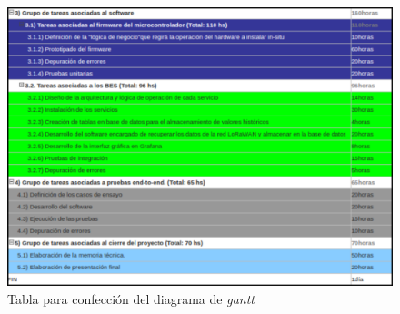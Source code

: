 \documentclass[11pt]{charter}
\begin{document}
\begin{figure}[H]
	\centering 
	\includegraphics[width=\textwidth]{./Figuras/gantt/3-fin.png}
	\caption{Tabla para confección del diagrama de \textit{gantt}}
	\label{fig:tablegantt2}
\end{figure}
\end{document}
